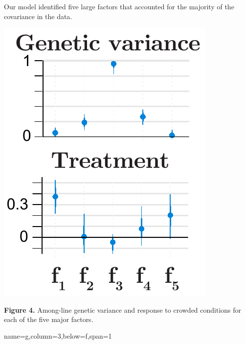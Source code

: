 \documentclass[landscape,paperwidth=48in,paperheight=36in,fontscale=0.35]{baposter}
\begin{document}
\begin{poster}
{\begin{multicols}{2}
Our model identified five large factors that accounted for the majority of the covariance in the data. 
\newpage
\begin{center}
\includegraphics[width=1\columnwidth]{Figure_factors2.pdf} 
\end{center}
\textbf{Figure 4.} Among-line genetic variance and response to crowded conditions for each of the five major factors.
\end{multicols}
}
 {name=g,column=3,below=f,span=1}{


}

\end{poster}
\end{document}

